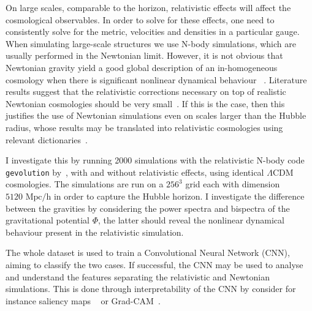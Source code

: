
On large scales, comparable to the horizon, relativistic effects will affect the cosmological observables. In order to solve for these effects, one need to consistently solve for the metric, velocities and densities in a particular gauge. When simulating large-scale structures we use N-body simulations, which are usually performed in the Newtonian limit. However, it is not obvious that Newtonian gravity yield a good global description of an in-homogeneous cosmology when there is significant nonlinear dynamical behaviour ~\parencite{jeong_large-scale_2012}. Literature results suggest that the relativistic corrections necessary on top of realistic Newtonian cosmologies should be very small~\parencite{chisari_connection_2011}. If this is the case, then this justifies the use of Newtonian simulations even on scales larger than the Hubble radius, whose results may be translated into relativistic cosmologies using relevant dictionaries~\parencite{green_newtonian_2012}.

I investigate this by running 2000 simulations with the relativistic N-body code \texttt{gevolution} by~\cite{adamek_gevolution_2016}, with and without relativistic effects, using identical $\Lambda$CDM cosmologies. The simulations are run on a $256^3$ grid each with dimension $5120\text{ Mpc/h}$ in order to capture the Hubble horizon. I investigate the difference between the gravities by considering the power spectra and bispectra of the gravitational potential $\Phi$, the latter should reveal the nonlinear dynamical behaviour present in the relativistic simulation. 

The whole dataset is used to train a Convolutional Neural Network (CNN), aiming to classify the two cases. If successful, the CNN may be used to analyse and understand the features separating the relativistic and Newtonian simulations. This is done through interpretability of the CNN by consider for instance saliency maps ~\parencite{alqaraawi_evaluating_2020} or Grad-CAM~\parencite{selvaraju_grad-cam_2020}. 